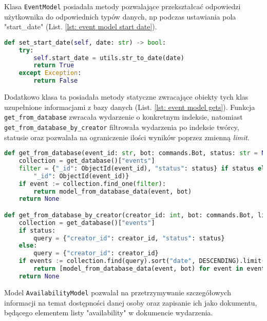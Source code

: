 \documentclass[11pt,a4paper]{article}
\newcommand{\classname}[1]{\texttt{#1}}
\begin{document}
Klasa \classname{EventModel} posiadała metody pozwalające przekształcać odpowiedzi użytkownika do odpowiednich typów danych, np podczas ustawiania pola "start\_date" (List. \ref{lst: event model start date}).

\begin{lstlisting}[language=Python,caption={Funkcja "set\_start\_date" klasy "EventModel"},label={lst: event model start date}]
def set_start_date(self, date: str) -> bool:
    try:
        self.start_date = utils.str_to_date(date)
        return True
    except Exception:
        return False
\end{lstlisting}

Dodatkowo klasa ta posiadała metody statyczne zwracające obiekty tych klas uzupełnione informacjami z bazy danych (List. \ref{lst: event model gets}). Funkcja \classname{get\_from\_database} zwracała wydarzenie o konkretnym indeksie, natomiast \classname{get\_from\_database\_by\_creator} filtrowała wydarzenia po indeksie twórcy, statusie oraz pozwalała na ograniczenie ilości wyników poprzez zmienną \textit{limit}. 


\begin{lstlisting}[language=Python,caption={Metody klasy "EventModel" służące do zwracania wydarzeń},label={lst: event model gets}]
def get_from_database(event_id: str, bot: commands.Bot, status: str = None):
    collection = get_database()["events"]
    filter = {"_id": ObjectId(event_id), "status": status} if status else {
        "_id": ObjectId(event_id)}
    if event := collection.find_one(filter):
        return model_from_database_data(event, bot)
    return None

def get_from_database_by_creator(creator_id: int, bot: commands.Bot, limit: int = 0, status: str = None):
    collection = get_database()["events"]
    if status:
        query = {"creator_id": creator_id, "status": status}
    else:
        query = {"creator_id": creator_id}
    if events := collection.find(query).sort("date", DESCENDING).limit(limit):
        return [model_from_database_data(event, bot) for event in events]
    return None
\end{lstlisting}

Model \classname{AvailabilityModel} pozwalał na przetrzymywanie szczegółowych informacji na temat dostępności danej osoby oraz zapisanie ich jako dokumentu, będącego elementem listy "availability" w dokumencie wydarzenia. 
\end{document}
